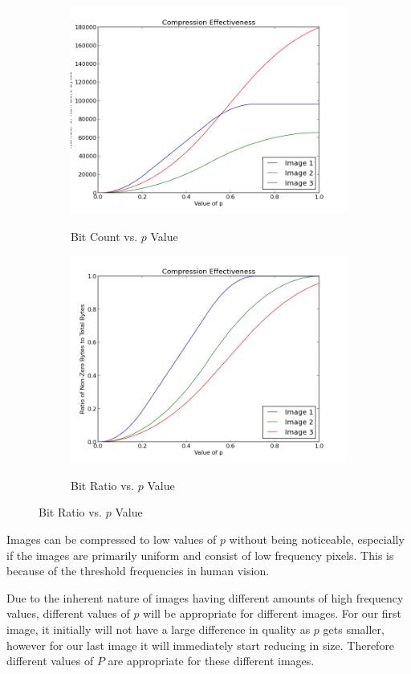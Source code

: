 \begin{figure}[ht]
    \centering
    \begin{subfigure}{0.41\textwidth}
        \includegraphics[scale=0.35]{./img/bitcount.png}
        \label{fig:bitcount}
        \caption{Bit Count vs. $p$ Value}
    \end{subfigure}
    \begin{subfigure}{0.41\textwidth}
        \includegraphics[scale=0.35]{./img/bitrat.png}
        \label{fig:bitrat}
        \caption{Bit Ratio vs. $p$ Value}
    \end{subfigure}
    \label{figs:bits}
\end{figure}

Images can be compressed to low values of $p$ without being noticeable, especially if the images are primarily uniform and consist of low frequency pixels. This is because of the threshold frequencies in human vision.

Due to the inherent nature of images having different amounts of high frequency values, different values of $p$ will be appropriate for different images. For our first image, it initially will not have a large difference in quality as $p$ gets smaller, however for our last image it will immediately start reducing in size. Therefore different values of $P$ are appropriate for these different images.
